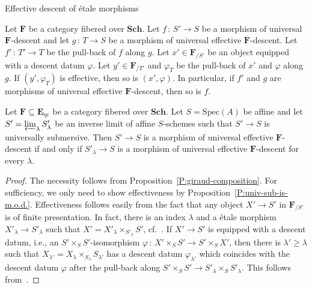 \documentclass[a4paper,twoside,11pt]{amsart}[2009/07/02] %
\newcommand{\pref}[1]{\eqref{#1}}
\newcommand{\map}[3]{#1\,:\, #2\rightarrow #3}
\newcommand{\etale}{\'{e}tale}
\newcommand{\Sch}{\mathbf{Sch}} %
\newcommand{\Spec}{\mathrm{Spec}}
\newcommand{\catE}{\mathbf{E}}
\newcommand{\catF}{\mathbf{F}}
\newcommand{\qc}{\mathrm{qc}}
\begin{document}
\begin{section}{Effective descent of \etale{} morphisms}
\begin{proposition}
\label{P:giraud-pullbacks}
Let $\catF$ be a category fibered over $\Sch$. Let $\map{f}{S'}{S}$ be a
morphism of universal $\catF$-descent and let $\map{g}{T}{S}$ be a morphism of
universal effective $\catF$-descent. Let $\map{f'}{T'}{T}$ be the pull-back of
$f$ along $g$. Let $x'\in\catF_{/S'}$ be an object equipped with a descent datum
$\varphi$. Let $y'\in\catF_{/T'}$ and $\varphi_T$ be the pull-back of $x'$ and
$\varphi$ along~$g$. If $(y',\varphi_T)$ is effective, then so is
$(x',\varphi)$. In particular, if $f'$ and $g$ are morphisms of universal
effective $\catF$-descent, then so is $f$.
\end{proposition}


\begin{proposition}\label{P:effectiveness-under-limits}
Let $\catF\subseteq \catE_{\qc}$ be a category fibered over $\Sch$. Let
$S=\Spec(A)$ be affine and let $S'=\varprojlim_\lambda S'_\lambda$ be an
inverse limit
of affine $S$-schemes such that $S'\to S$ is universally submersive. Then
$S'\to S$ is a morphism of universal effective $\catF$-descent if and only if
$S'_\lambda\to S$ is a morphism of universal effective $\catF$-descent for
every $\lambda$.
\end{proposition}
\begin{proof}
The necessity follows from Proposition~\pref{P:giraud-composition}. For
sufficiency, we only need to show effectiveness by
Proposition~\pref{P:univ-sub-is-m.o.d.}. Effectiveness follows easily from the
fact that any object $X'\to S'$ in $\catF_{/S'}$ is of finite presentation. In
fact, there is an index $\lambda$ and a \etale{} morphism $X'_\lambda\to
S'_\lambda$ such that $X'=X'_\lambda\times_{S'_\lambda} S'$,
cf.~\cite[Thm.~8.8.2, Prop.~17.7.8]{egaIV}. If $X'\to S'$ is equipped with
a descent datum, i.e., an $S'\times_S S'$-isomorphism $\map{\varphi}{X'\times_S
S'}{S'\times_S X'}$, then there is $\lambda'\geq \lambda$ such that
$X_{\lambda'}=X_\lambda\times_{S_\lambda} S_{\lambda'}$ has a descent datum
$\varphi_{\lambda'}$ which coincides with the descent datum $\varphi$ after the
pull-back along $S'\times_S S'\to S'_\lambda\times_S S'_\lambda$.
This follows from~\cite[Cor.~8.8.2.5]{egaIV}.
\end{proof}


\end{section}
\end{document}
